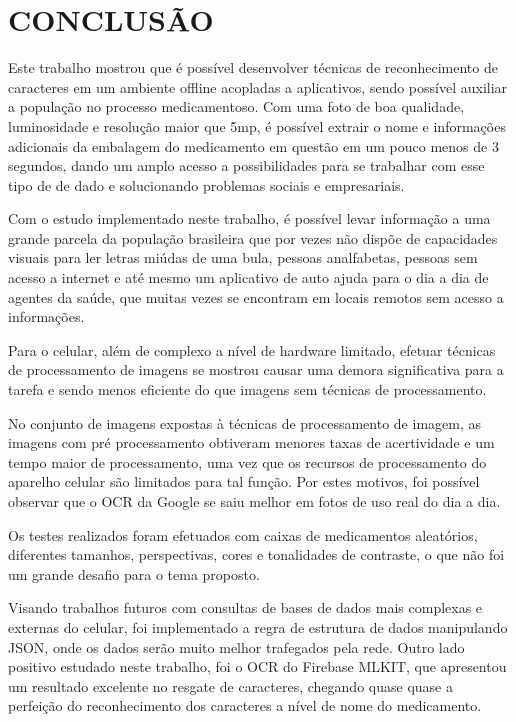 \section{CONCLUSÃO}

Este trabalho mostrou que é possível desenvolver técnicas de reconhecimento de caracteres em um ambiente offline acopladas a aplicativos, sendo possível auxiliar a população no processo medicamentoso. Com uma foto de boa qualidade, luminosidade e resolução maior que 5mp, é possível extrair o nome e informações adicionais da embalagem do medicamento em questão em um pouco menos de 3 segundos, dando um amplo acesso a possibilidades para se trabalhar com esse tipo de de dado e solucionando problemas sociais e empresariais.

Com o estudo implementado neste trabalho, é possível levar informação a uma grande parcela da população brasileira que por vezes não dispõe de capacidades visuais para ler letras miúdas de uma bula, pessoas analfabetas, pessoas sem acesso a internet e até mesmo um aplicativo de auto ajuda para o dia a dia de agentes da saúde, que muitas vezes se encontram em locais remotos sem acesso a informações.  

Para o celular, além de complexo a nível de hardware limitado, efetuar técnicas de processamento de imagens se mostrou causar uma demora significativa para a tarefa e sendo menos eficiente do que imagens sem técnicas de processamento.

No conjunto de imagens expostas à técnicas de processamento de imagem, as imagens com pré processamento obtiveram menores taxas de acertividade e um tempo maior de processamento, uma vez que os recursos de processamento do aparelho celular são limitados para tal função. Por estes motivos, foi possível observar que o OCR da Google se saiu melhor em fotos de uso real do dia a dia.

Os testes realizados foram efetuados com caixas de medicamentos aleatórios, diferentes tamanhos, perspectivas, cores e tonalidades de contraste, o que não foi um grande desafio para o tema proposto.

Visando trabalhos futuros com consultas de bases de dados mais complexas e externas do celular, foi implementado a regra de estrutura de dados manipulando JSON, onde os dados serão muito melhor trafegados pela rede. Outro lado positivo estudado neste trabalho, foi o OCR do Firebase MLKIT, que apresentou um resultado excelente no resgate de caracteres, chegando quase quase a perfeição do reconhecimento dos caracteres a nível de nome do medicamento.

